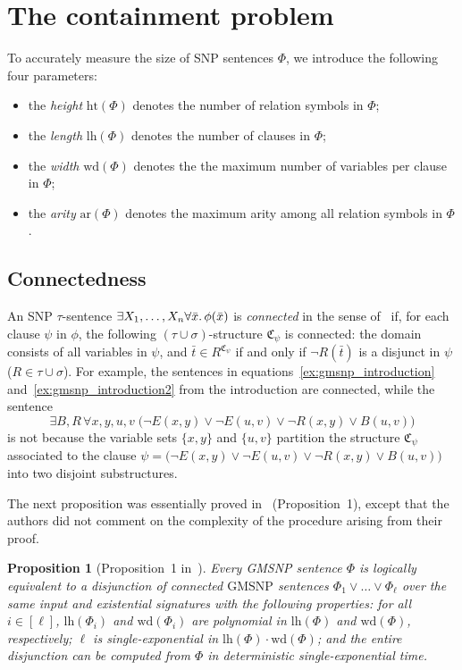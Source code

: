 \documentclass[oneside,reqno,12pt]{amsart}
\theoremstyle{plain}
\newtheorem{proposition}[thm]{Proposition}
\theoremstyle{remark}
\newcommand{\struct}[1]{\mathfrak{#1}}
\newcommand{\hh}{\ensuremath{\mathrm{ht}}\xspace}
\newcommand{\lh}{\ensuremath{\mathrm{lh}}\xspace}
\newcommand{\wh}{\ensuremath{\mathrm{wd}}\xspace}
\newcommand{\ar}{\ensuremath{\mathrm{ar}}\xspace}
\newcommand{\GMSNP}{\ensuremath{\mathrm{GMSNP}}\xspace}
\begin{document}
{ 
\section{The containment problem} 
\label{section:decidability}


To accurately measure the size of SNP sentences $\Phi$, we introduce the following four parameters:
\begin{itemize}
    \item the \emph{height} $\hh(\Phi)$ denotes the number of relation symbols in $\Phi$;
    \item the \emph{length} $\lh(\Phi)$ denotes the number of clauses in $\Phi$; 
    \item the \emph{width} $\wh(\Phi)$ denotes the the maximum number of variables per clause in $\Phi$;
    \item the \emph{arity} $\ar(\Phi)$ denotes the maximum arity among all relation symbols in $\Phi$.  
\end{itemize}


\subsection{Connectedness}  \label{section:connectedness}


 An SNP $\tau$-sentence $\exists X_1,\dots, X_n \forall \bar{x}\ldotp \phi(\bar{x})$ is \emph{connected} in the sense of~\cite{bodirsky_asnp,Bodirsky_book} if, for each clause $\psi$ in $\phi$, the following $(\tau\cup \sigma)$-structure $\struct{C}_{\psi}$ is connected: the domain consists of all variables in $\psi$, and $\bar{t}\in R^{\struct{C}_{\psi}}$ if and only if $\neg R(\bar{t})$ is a disjunct in $\psi$ ($R\in \tau\cup \sigma$). 
For example, the sentences in equations~\eqref{ex:gmsnp_introduction} and~\eqref{ex:gmsnp_introduction2} from the introduction are connected, while the sentence
\begin{equation*}
\exists B,R\, \forall x,y,u,v\;  \big( \neg E(x,y) \vee \neg  E(u,v) \vee \neg  R(x,y) \vee B(u,v)\big)
\end{equation*}
is not because 
the variable sets $\{x,y\}$ and $\{u,v\}$ partition the structure $\struct{C}_{\psi}$ associated to the clause $ \psi=\big( \neg E(x,y) \vee \neg  E(u,v) \vee \neg  R(x,y) \vee B(u,v)\big)$ into two disjoint substructures.

The next proposition was essentially proved in~\cite{bodirsky_asnp} (Proposition~1), except that the authors did not comment on the complexity of the procedure arising from their proof.
\begin{proposition}[Proposition~1 in~\cite{bodirsky_asnp}] \label{prop:connected}
Every GMSNP sentence $\Phi$ is logically equivalent to a disjunction of connected $\GMSNP$ sentences $\Phi_1\vee\dots\vee\Phi_\ell$ over the same input  and existential signatures  with the following properties: for all $i\in[\ell]$, $\lh(\Phi_i)$ and $\wh(\Phi_i)$ are polynomial in $\lh(\Phi)$ and $\wh(\Phi)$, respectively; $\ell$ is single-exponential in $\lh(\Phi)\cdot\wh(\Phi)$; and the entire  disjunction can be computed from $\Phi$ in deterministic single-exponential time. 
\end{proposition}

}
\end{document}
